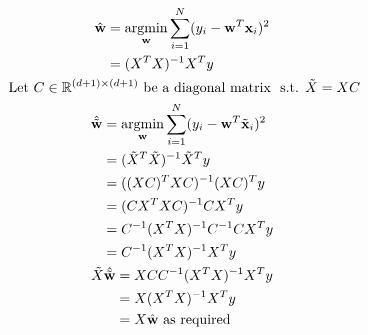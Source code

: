 \documentclass{introtosml}
\begin{document}
\begin{p}
  \item
    \begin{gather*}
      \begin{aligned}
        \hat{\vec{w}}
        & = \argmin_\vec{w} \sum_{i=1}^N (y_i - \vec{w}^T \vec{x}_i)^2 \\
        & = (X^T X)^{-1} X^T y
      \end{aligned} \\
      \text{Let} C \in \field{R}^{(d+1) \times (d+1)} \text{be a diagonal matrix}
          \st \tilde{X} = XC \\
      \begin{aligned}
        \hat{\tilde{\vec{w}}}
        & = \argmin_\vec{w} \sum_{i=1}^N (y_i - \vec{w}^T \tilde{\vec{x}}_i)^2 \\
        & = (\tilde{X}^T \tilde{X})^{-1} \tilde{X}^T y \\
        & = ((XC)^T XC)^{-1} (XC)^T y \\
        & = (CX^T XC)^{-1} CX^T y \\
        & = C^{-1} (X^T X)^{-1} C^{-1} CX^T y \\
        & = C^{-1} (X^T X)^{-1} X^T y
      \end{aligned} \\
      \begin{aligned}
        \tilde{X}\hat{\tilde{\vec{w}}}
        & = XCC^{-1} (X^T X)^{-1} X^T y \\
        & = X (X^T X)^{-1} X^T y \\
        & = X \hat{\vec{w}} \text{as required}
      \end{aligned}
    \end{gather*}

  \item
\end{p}
\end{document}
